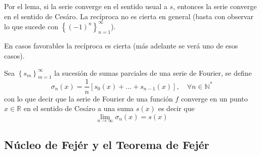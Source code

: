 \documentclass[12pt]{report}
\theoremstyle{largebreak}
\begin{document}
    Por el lema, si la serie converge en el sentido usual a $s$, entonces la serie converge en el sentido de Cesáro. La recíproca no es cierta en general (basta con observar lo que sucede con $\left\{(-1)^n \right\}_{ n=1}^\infty$).
    
    En casos favorables la recíproca es cierta (más adelante se verá uno de esos casos).

    Sea $\left\{s_m \right\}_{ m=1}^\infty$ la sucesión de sumas parciales de una serie de Fourier, se define
    \begin{equation*}
        \sigma_n(x)=\frac{1}{n}\left[s_0(x)+...+s_{n-1}(x) \right],\quad\forall n\in\mathbb{N}^*
    \end{equation*}
    con lo que decir que la serie de Fourier de una función $f$ converge en un punto $x\in\mathbb{R}$ en el sentido de Cesáro a una suma $s(x)$ es decir que
    \begin{equation*}
        \lim_{ n\rightarrow\infty}\sigma_n(x)=s(x)
    \end{equation*}

    \subsection{Núcleo de Fejér y el Teorema de Fejér}
\end{document}
